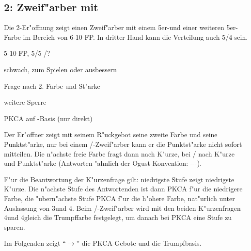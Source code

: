 \subsection{2\coe: Zweif"arber mit \co} \label{2coeur}

Die 2\coe-Er"offnung zeigt einen Zweif"arber mit einem 5er-\co und einer
weiteren 5er-Farbe im Bereich von 6-10 FP. In dritter Hand kann die Verteilung
auch 5/4 sein.

\bdsc
\item[2\coe] 5-10 FP, 5/5 \co/?
  \bdsc
  \item[2\pik] schwach, zum Spielen oder ausbessern
  \item[2\SA] Frage nach 2. Farbe und St"arke
  \item[3\coe] weitere Sperre
  \item[4\tre] PKCA auf \co-Basis (nur direkt)
  \edsc
\edsc


Der Er"offner zeigt mit seinem R"uckgebot seine zweite Farbe und seine
Punktst"arke, nur bei einem \co/\tr-Zweif"arber kann er die Punktst"arke nicht
sofort mitteilen. Die n"achste freie Farbe fragt dann nach K"urze, bei \co/\tr
nach K"urze und Punktst"arke (Antworten "ahnlich der Ogust-Konvention:
\mini{}-\mini{}-\maxi{}-\maxi).

F"ur die Beantwortung der K"urzenfrage gilt: niedrigste Stufe zeigt niedrigste
K"urze. Die n"achste Stufe des Antwortenden ist dann PKCA f"ur die niedrigere
Farbe, die "ubern"achste Stufe PKCA f"ur die h"ohere Farbe, nat"urlich unter
Auslassung von 3\SA und 4\coe. Beim \co/\pi-Zweif"arber wird mit den beiden
K"urzenfragen 4\tre und 4\kar gleich die Trumpffarbe festgelegt, um danach bei
PKCA eine Stufe zu sparen.

Im Folgenden zeigt "`$\rightarrow$"' die PKCA-Gebote und die Trumpfbasis.


